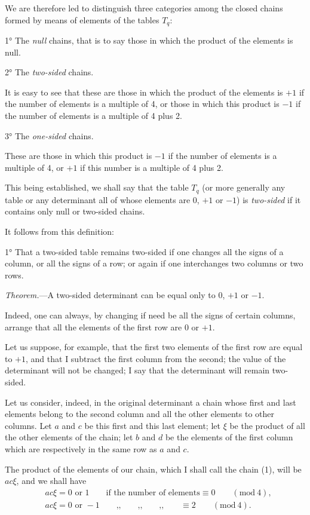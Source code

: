\documentclass{article}
\begin{document}
We are therefore led to distinguish three categories among the closed chains formed by means of elements of the tables $T_{q}$:

1° The \emph{null} chains, that is to say those in which the product of the elements is null.

2° The \emph{two-sided} chains.

It is easy to see that these are those in which the product of the elements is $+1$ if the number of elements is a multiple of 4, or those in which this product is $-1$ if the number of elements is a multiple of 4 plus 2.

3° The \emph{one-sided} chains.

These are those in which this product is $-1$ if the number of elements is a multiple of 4, or $+1$ if this number is a multiple of 4 plus 2.

This being established, we shall say that the table $T_{q}$ (or more generally any table or any determinant all of whose elements are 0, $+1$ or $-1$) is \emph{two-sided} if it contains only null or two-sided chains.

It follows from this definition:

1° That a two-sided table remains two-sided if one changes all the signs of a column, or all the signs of a row; or again if one interchanges two columns or two rows.

\emph{Theorem.}---A two-sided determinant can be equal only to 0, $+1$ or $-1$.

Indeed, one can always, by changing if need be all the signs of certain columns, arrange that all the elements of the first row are 0 or $+1$.

Let us suppose, for example, that the first two elements of the first row are equal to $+1$, and that I subtract the first column from the second; the value of the determinant will not be changed; I say that the determinant will remain two-sided.

Let us consider, indeed, in the original determinant a chain whose first and last elements belong to the second column
and all the other elements to other columns. Let $a$ and $c$ be this first and this last element; let $\xi$ be the product of all the other elements of the chain; let $b$ and $d$ be the elements of the first column which are respectively in the same row as $a$ and $c$.

The product of the elements of our chain, which I shall call the chain (1), will be $ac\xi$, and we shall have
\[ \begin{aligned} &ac\xi = 0 \text{ or } 1 \qquad \text{if the number of elements} \equiv 0 \qquad (\text{mod}\ 4),\\ &ac\xi = 0 \text{ or } -1 \qquad \text{,,} \qquad \text{,,} \qquad \text{,,} \qquad \equiv 2 \qquad (\text{mod}\ 4). \end{aligned} \]
\end{document}
